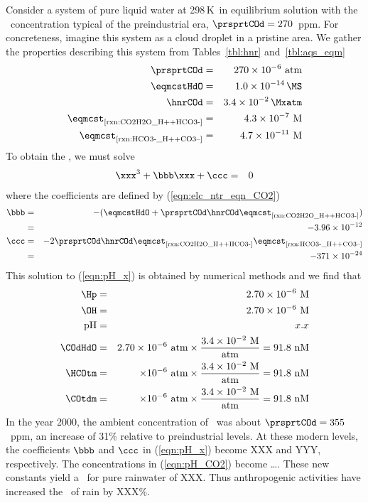 \documentclass[12pt,twoside]{book}
\begin{document}
Consider a system of pure liquid water at 298\,K\ in equilibrium
solution with the \COd\ concentration typical of the preindustrial
era, $\prsprtCOd = 270$~ppm. 
For concreteness, imagine this system as a cloud droplet in a pristine 
area. 
We gather the properties describing this system from
Tables~\ref{tbl:hnr} and~\ref{tbl:aqs_eqm}
\begin{eqnarray*}
\prsprtCOd & = & 270 \times 10^{-6} \mbox{~atm} \\ 
\eqmcstHdO & = & 1.0 \times 10^{-14} \mbox{\,\MS} \\ 
\hnrCOd & = & 3.4 \times 10^{-2} \mbox{\,\Mxatm} \\  
\eqmcst_{\mbox{\scriptsize \ref{rxn:CO2H2O_H++HCO3-}}} & = & 4.3 \times 10^{-7} \mbox{~M} \\ 
\eqmcst_{\mbox{\scriptsize \ref{rxn:HCO3-_H++CO3--}}} & = & 4.7 \times 10^{-11} \mbox{~M} 
\end{eqnarray*}
To obtain the \pH, we must solve 
\begin{eqnarray}
\label{eqn:pH_x}
\xxx^{3} + \bbb \xxx + \ccc & = & 0
\end{eqnarray}
where the coefficients are defined by (\ref{eqn:elc_ntr_eqn_CO2})
\begin{eqnarray*}
\bbb & = & - ( \eqmcstHdO + \prsprtCOd \hnrCOd
\eqmcst_{\mbox{\scriptsize \ref{rxn:CO2H2O_H++HCO3-}}} ) \\
& = & -3.96 \times 10^{-12} \\ 
\ccc & = & - 2 \prsprtCOd \hnrCOd \eqmcst_{\mbox{\scriptsize \ref{rxn:CO2H2O_H++HCO3-}}} 
\eqmcst_{\mbox{\scriptsize \ref{rxn:HCO3-_H++CO3--}}} \\
& = & -371 \times 10^{-24}
\end{eqnarray*}
This solution to (\ref{eqn:pH_x}) is obtained by numerical methods
and we find that  
\begin{eqnarray}
\Hp & = & 2.70 \times 10^{-6} \mbox{~M} \nonumber \\   
\OH & = & 2.70 \times 10^{-6} \mbox{~M} \nonumber \\   
\mbox{pH} & = & x.x \nonumber \\   
\COdHdO & = & 2.70 \times 10^{-6} \mbox{~atm} \times \frac{3.4 \times
10^{-2} \mathrm{~M}}{\mathrm{atm} } = 91.8 \mbox{~nM} \nonumber \\   
\HCOtm & = & \times 10^{-6} \mbox{~atm} \times \frac{3.4 \times
10^{-2} \mathrm{~M}}{\mathrm{atm} } = 91.8 \mbox{~nM} \nonumber \\   
\COtdm & = & \times 10^{-6} \mbox{~atm} \times \frac{3.4 \times
10^{-2} \mathrm{~M}}{\mathrm{atm} } = 91.8 \mbox{~nM}
\label{eqn:pH_CO2}
\end{eqnarray}
In the year 2000, the ambient concentration of \COd\ was about
$\prsprtCOd = 355$~ppm, an increase of 31\% relative to preindustrial
levels.  
At these modern levels, the coefficients $\bbb$ and $\ccc$ in
(\ref{eqn:pH_x}) become XXX and YYY, respectively.
The concentrations in (\ref{eqn:pH_CO2}) become \ldots.
These new constants yield a \pH\ for pure rainwater of XXX.
Thus anthropogenic activities have increased the \pH\ of rain by XXX\%.
\end{document}

